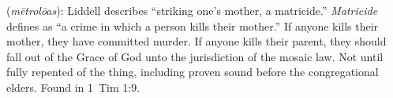 \item[Mother-murderer,]

(\textit{mētrolōas}):
Liddell describes ``striking one's mother, a matricide.'' \emph{Matricide} defines as ``a crime in which a person kills their mother.'' If anyone kills their mother, they have committed murder. If anyone kills their parent, they should fall out of the Grace of God unto the jurisdiction of the mosaic law. Not until fully repented of the thing, including proven sound before the congregational elders.
Found in 1~Tim 1:9.
